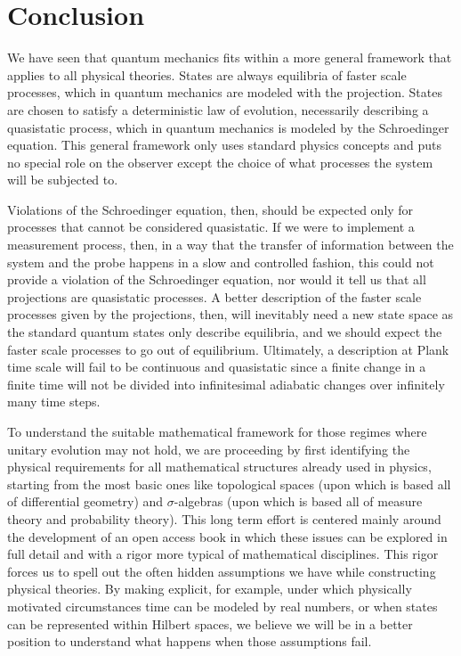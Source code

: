 \documentclass[11pt]{article}
\begin{document}
\section{Conclusion}

We have seen that quantum mechanics fits within a more general framework that applies to all physical theories. States are always equilibria of faster scale processes, which in quantum mechanics are modeled with the projection. States are chosen to satisfy a deterministic law of evolution, necessarily describing a quasistatic process, which in quantum mechanics is modeled by the Schroedinger equation. This general framework only uses standard physics concepts and puts no special role on the observer except the choice of what processes the system will be subjected to.

Violations of the Schroedinger equation, then, should be expected only for processes that cannot be considered quasistatic. If we were to implement a measurement process, then, in a way that the transfer of information between the system and the probe happens in a slow and controlled fashion, this could not provide a violation of the Schroedinger equation, nor would it tell us that all projections are quasistatic processes. A better description of the faster scale processes given by the projections, then, will inevitably need a new state space as the standard quantum states only describe equilibria, and we should expect the faster scale processes to go out of equilibrium. Ultimately, a description at Plank time scale will fail to be continuous and quasistatic since a finite change in a finite time will not be divided into infinitesimal adiabatic changes over infinitely many time steps.

To understand the suitable mathematical framework for those regimes where unitary evolution may not hold, we are proceeding by first identifying the physical requirements for all mathematical structures already used in physics, starting from the most basic ones like topological spaces (upon which is based all of differential geometry) and $\sigma$-algebras (upon which is based all of measure theory and probability theory). This long term effort is centered mainly around the development of an open access book in which these issues can be explored in full detail and with a rigor more typical of mathematical disciplines. This rigor forces us to spell out the often hidden assumptions we have while constructing physical theories. By making explicit, for example, under which physically motivated circumstances time can be modeled by real numbers, or when states can be represented within Hilbert spaces, we believe we will be in a better position to understand what happens when those assumptions fail.
\end{document}
